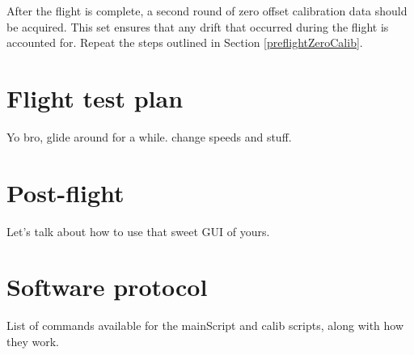 After the flight is complete, a second round of zero offset calibration data should be acquired. This set ensures that any drift that occurred during the flight is accounted for. Repeat the steps outlined in Section \ref{preflightZeroCalib}.

\section{Flight test plan}
Yo bro, glide around for a while. change speeds and stuff.

\section{Post-flight}
Let's talk about how to use that sweet GUI of yours.

\section{Software protocol}
List of commands available for the mainScript and calib scripts, along with how they work.